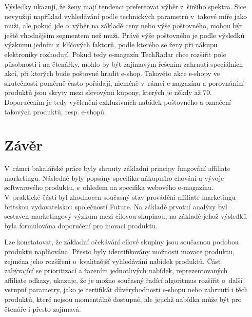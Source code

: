 \documentclass[12pt,twoside,openany]{fithesis}
\makeatletter
\def\cleardoublepage{\clearpage\if@twoside \ifodd\c@page\else
        \thispagestyle{empty}
        \hbox{}\newpage\if@twocolumn\hbox{}\newpage\fi\fi\fi}
\makeatother
\begin{document}
                          Výsledky ukazují, že ženy mají tendenci 
prefereovat výběr z~širšího spektra. Sice nevyužijí například 
vyhledávání podle technických parametrů v~takové míře jako muži, ale 
pokud jde o~výběr na základě ceny nebo výše poštovného, mohou být 
ještě vhodnějším segmentem než muži. Právě výše poštovného je 
podle výsledků výzkumu jedním z~klíčových faktorů, podle kterého se 
ženy při nákupu elektroniky rozhodují. Pokud tedy e-magazín TechRadar chce 
rozšířit pole působnosti i na čtenářky, mohlo by být zajímavým 
řešením zahrnutí speciálních akcí, při kterých bude poštovné hradit 
e-shop. Takovéto akce e-shopy ve skutečnosti poměrně často pořádají, 
nicméně v~rámci e-magazínu a porovnáníní produktů jsou skryty mezi 
slevovými kupony, kterých je někdy až 70. Doporučením je tedy 
vyčlenění exkluzivních nabídek poštovného a označení takových 
produktů, resp. e-shopů.

\cleardoublepage
{}
{}
\chapter*{Závěr}
\markright{\contentsname}



                          V~rámci bakalářské práce byly shrnuty základní 
principy fungování affiliate marketingu. Následně byly popsány specifika 
nákupního chování a vývoje softwarového produktu, s~ohledem na specifika 
webového e-magazínu. V~praktické části byl zhodnocen současný stav 
provádění affiliate marketingu britskou vydavatelskou společností Future. 
Na základě prvotní analýzy byl sestaven marketingový výzkum mezi cílovou 
skupinou, na základě jehož výsledků byla formulována doporučení pro 
inovaci produktu.

                          Lze konstatovat, že základní očekávání 
cílové skupiny jsou současnou podobou produktu naplňována. Přesto byly 
identifikovány možnosti inovace produktu, zejména jeho rozšíření 
o~kvalitnější vyhledávání nabídek produktů. Část zabývající se 
prioritizací a řazením jednotlivých nabídek, reprezentovaných affiliate 
odkazy, ukazuje, že je možno současný řadící algoritmus rozšířit 
o~další vstupní parametry, jako je certifikát důvěryhodnosti e-shopu nebo 
zahrnutí i těch produktů, které nejsou momentálně dostupné, ale jejichž 
nabídka může být pro čtenáře i přesto zajímavá.
\end{document}
